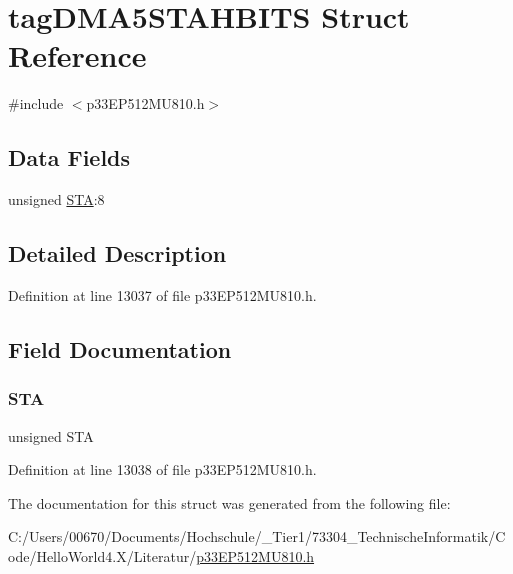 \hypertarget{structtag_d_m_a5_s_t_a_h_b_i_t_s}{}\section{tag\+D\+M\+A5\+S\+T\+A\+H\+B\+I\+TS Struct Reference}
\label{structtag_d_m_a5_s_t_a_h_b_i_t_s}


{\ttfamily \#include $<$p33\+E\+P512\+M\+U810.\+h$>$}

\subsection*{Data Fields}
\begin{DoxyCompactItemize}
\item 
unsigned \hyperlink{structtag_d_m_a5_s_t_a_h_b_i_t_s_a0eec78ddd2c12af678d5fab70fe62d14}{S\+TA}\+:8
\end{DoxyCompactItemize}


\subsection{Detailed Description}


Definition at line 13037 of file p33\+E\+P512\+M\+U810.\+h.



\subsection{Field Documentation}
\mbox{\label{structtag_d_m_a5_s_t_a_h_b_i_t_s_a0eec78ddd2c12af678d5fab70fe62d14}} 
\subsubsection{\texorpdfstring{S\+TA}{STA}}
{\footnotesize\ttfamily unsigned S\+TA}



Definition at line 13038 of file p33\+E\+P512\+M\+U810.\+h.



The documentation for this struct was generated from the following file\+:\begin{DoxyCompactItemize}
\item 
C\+:/\+Users/00670/\+Documents/\+Hochschule/\+\_\+\+Tier1/73304\+\_\+\+Technische\+Informatik/\+Code/\+Hello\+World4.\+X/\+Literatur/\hyperlink{p33_e_p512_m_u810_8h}{p33\+E\+P512\+M\+U810.\+h}\end{DoxyCompactItemize}
